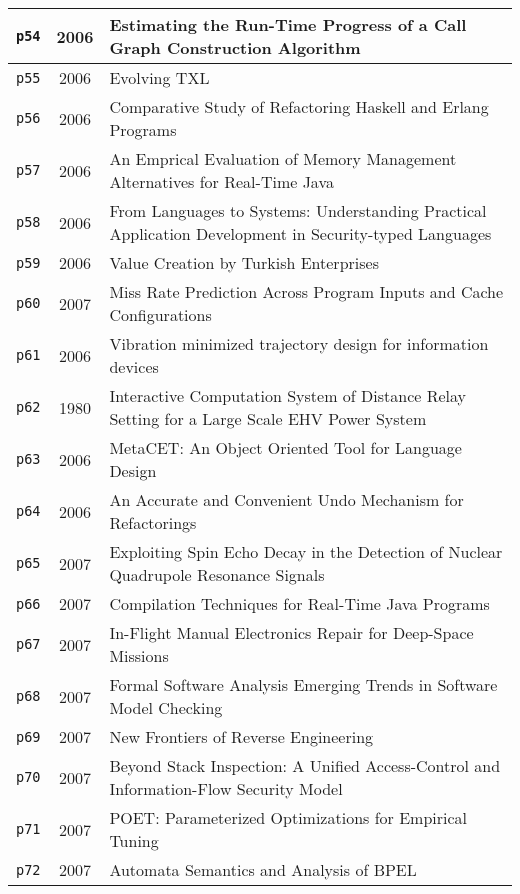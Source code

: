 \begin{longtable}{| c | c | p{16cm} |}
  \hline
  \texttt{p54} & 2006 & Estimating the Run-Time Progress of a Call Graph Construction Algorithm \\
  \hline
  \texttt{p55} & 2006 & Evolving TXL \\
  \hline
  \texttt{p56} & 2006 & Comparative Study of Refactoring Haskell and Erlang Programs \\
  \hline
  \texttt{p57} & 2006 & An Emprical Evaluation of Memory Management Alternatives for Real-Time Java \\
  \hline
  \texttt{p58} & 2006 & From Languages to Systems: Understanding Practical Application Development in Security-typed Languages \\
  \hline
  \texttt{p59} & 2006 & Value Creation by Turkish Enterprises \\
  \hline
  \texttt{p60} & 2007 & Miss Rate Prediction Across Program Inputs and Cache Configurations \\
  \hline
  \texttt{p61} & 2006 & Vibration minimized trajectory design for information devices \\
  \hline
  \texttt{p62} & 1980 & Interactive Computation System of Distance Relay Setting for a Large Scale EHV Power System \\
  \hline
  \texttt{p63} & 2006 & MetaCET: An Object Oriented Tool for Language Design \\
  \hline
  \texttt{p64} & 2006 & An Accurate and Convenient Undo Mechanism for Refactorings \\
  \hline
  \texttt{p65} & 2007 & Exploiting Spin Echo Decay in the Detection of Nuclear Quadrupole Resonance Signals \\
  \hline
  \texttt{p66} & 2007 & Compilation Techniques for Real-Time Java Programs \\
  \hline
  \texttt{p67} & 2007 & In-Flight Manual Electronics Repair for Deep-Space Missions \\
  \hline
  \texttt{p68} & 2007 & Formal Software Analysis Emerging Trends in Software Model Checking \\
  \hline
  \texttt{p69} & 2007 & New Frontiers of Reverse Engineering \\
  \hline
  \texttt{p70} & 2007 & Beyond Stack Inspection: A Unified Access-Control and Information-Flow Security Model \\
  \hline
  \texttt{p71} & 2007 & POET: Parameterized Optimizations for Empirical Tuning \\
  \hline
  \texttt{p72} & 2007 & Automata Semantics and Analysis of BPEL \\

\end{longtable}
